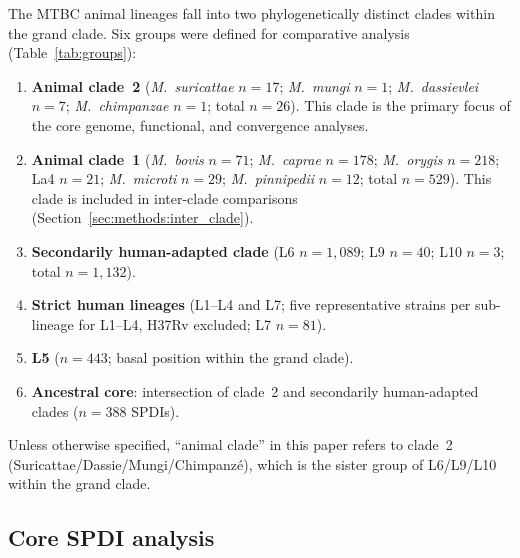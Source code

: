 \documentclass[11pt,a4paper]{article}
\begin{document}
The MTBC animal lineages fall into two phylogenetically distinct clades
within the grand clade. Six groups were defined for comparative analysis
(Table~\ref{tab:groups}):
%
\begin{enumerate}
  \item \textbf{Animal clade~2} (\textit{M.~suricattae} $n = 17$;
        \textit{M.~mungi} $n = 1$; \textit{M.~dassievlei} $n = 7$;
        \textit{M.~chimpanzae} $n = 1$; total $n = 26$).
        This clade is the primary focus of the core genome, functional,
        and convergence analyses.
  \item \textbf{Animal clade~1} (\textit{M.~bovis} $n = 71$;
        \textit{M.~caprae} $n = 178$; \textit{M.~orygis} $n = 218$;
        La4 $n = 21$; \textit{M.~microti} $n = 29$;
        \textit{M.~pinnipedii} $n = 12$; total $n = 529$).
        This clade is included in inter-clade comparisons
        (Section~\ref{sec:methods:inter_clade}).
  \item \textbf{Secondarily human-adapted clade} (L6 $n = 1{,}089$; L9 $n = 40$;
        L10 $n = 3$; total $n = 1{,}132$).
  \item \textbf{Strict human lineages} (L1--L4 and L7; five representative
        strains per sub-lineage for L1--L4, H37Rv excluded;
        L7 $n = 81$).
  \item \textbf{L5} ($n = 443$; basal position within the grand clade).
  \item \textbf{Ancestral core}: intersection of clade~2 and secondarily
        human-adapted clades ($n = 388$ SPDIs).
\end{enumerate}

Unless otherwise specified, ``animal clade'' in this paper refers to
clade~2 (Suricattae/Dassie/Mungi/Chimpanzé), which is the sister group
of L6/L9/L10 within the grand clade.

\subsection{Core SPDI analysis}
\label{sec:methods:spdi}
\end{document}
